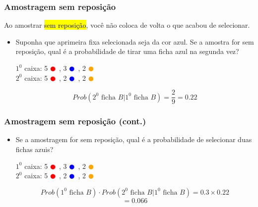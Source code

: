 
\begin{frame}
\frametitle{Amostragem sem reposição}
\justifying
Ao amostrar \hl{sem reposição}, você não coloca de volta o que acabou de selecionar.

\begin{itemize}

\pause
\justifying
\item Suponha que aprimeira fixa selecionada seja da cor azul. Se a amostra for sem reposição, qual é a probabilidade de tirar uma ficha azul na segunda vez?
\pause
\begin{center}
$1^{0}$ caixa: 5 \textcolor{red}{$\CIRCLE$}~, 3 \textcolor{blue}{$\CIRCLE$}~, 2 \textcolor{orange}{$\CIRCLE$} \\
\pause
$2^{0}$ caixa: 5 \textcolor{red}{$\CIRCLE$}~, 2 \textcolor{blue}{$\CIRCLE$}~, 2 \textcolor{orange}{$\CIRCLE$}
\end{center}
\pause
\[ Prob(2^{0} \text{ ficha } B | 1^{0} \text{ ficha } B) = \frac{2}{9} = 0.22 \]

\pause

\end{itemize}
\end{frame}


\begin{frame}
\frametitle{Amostragem sem reposição (cont.)}

\begin{itemize}
\justifying
\item Se a amostragem for sem reposição, qual é a probabilidade de selecionar duas fichas azuis?
\begin{center}

\pause
$1^{0}$ caixa: 5 \textcolor{red}{$\CIRCLE$}~, 3 \textcolor{blue}{$\CIRCLE$}~, 2 \textcolor{orange}{$\CIRCLE$} \\
$2^{0}$ caixa: 5 \textcolor{red}{$\CIRCLE$}~, 2 \textcolor{blue}{$\CIRCLE$}~, 2 \textcolor{orange}{$\CIRCLE$}
\end{center}
\pause
\[ Prob(1^{0} \text{ ficha } B) \cdot Prob(2^{0} \text{ ficha } B | 1^{0} \text{ ficha } B)  = 0.3 \times 0.22 \]
\[ = 0.066 \]

\end{itemize}

\end{frame}


